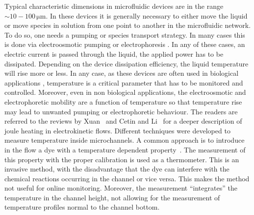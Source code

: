 \documentclass[twocolumn]{svjour3}       %
\begin{document}
Typical characteristic dimensions in microfluidic devices are in the range $\sim10-100\, \mathrm{\mu m}$. In these devices it is generally necessary to either move the liquid or move species in solution from one point to another in the microfluidic network. To do so, one needs a pumping or species transport strategy. In many cases this is done via electroosmotic pumping or electrophoresis \cite{hunter2001,lyklema1995}. In any of these cases, an electric current is passed through the liquid, the applied power has to be dissipated. Depending on the device dissipation efficiency, the liquid temperature will rise more or less. In any case, as these devices are often used in biological applications \cite{tian2008}, temperature is a critical parameter that has to be monitored and controlled. Moreover, even in non biological applications, the electroosmotic and electrophoretic mobility are a function of temperature \cite{tang2006} so that temperature rise may lead to unwanted pumping or electrophoretic behaviour. The readers are referred to the reviews by Xuan~\cite{xuan2008} and Cetin and Li~\cite{cetin2008} for a deeper description of joule heating in electrokinetic flows. 
Different techniques were developed to measure temperature inside microchannels. A common approach is to introduce in the flow a dye with a temperature dependent property~\cite{tang2006,ross2001,erickson2003,dye1,dye2}. The measurement of this property with the proper calibration is used as a thermometer. This is an invasive method, with the disadvantage that the dye can interfere with the chemical reactions occurring in the channel or vice versa. This makes the method not useful for online monitoring. Moreover, the measurement ``integrates'' the temperature in the channel height, not allowing for the measurement of temperature profiles normal to the channel bottom. 
\end{document}
